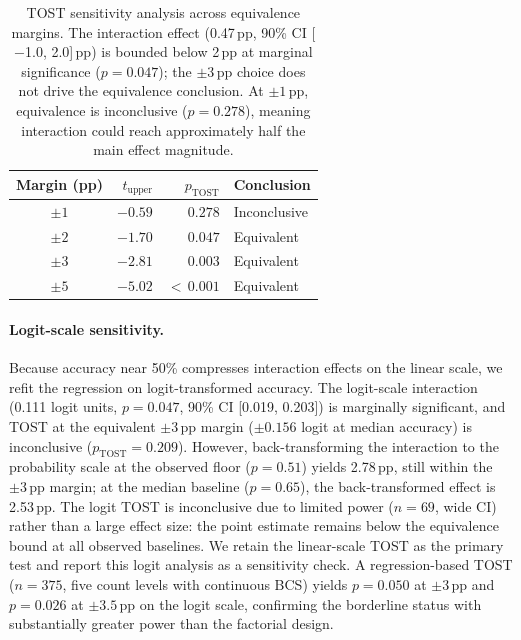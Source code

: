 \documentclass[11pt]{article}
\begin{document}
\begin{table}[h]
\centering
\small
\caption{TOST sensitivity analysis across equivalence margins. The interaction effect (0.47\,pp, 90\% CI [$-$1.0, 2.0]\,pp) is bounded below 2\,pp at marginal significance ($p = 0.047$); the $\pm 3$\,pp choice does not drive the equivalence conclusion. At $\pm 1$\,pp, equivalence is inconclusive ($p = 0.278$), meaning interaction could reach approximately half the main effect magnitude.}
\label{tab:tost_sensitivity}
\begin{tabular}{crrl}
\toprule
\textbf{Margin (pp)} & \textbf{$t_{\text{upper}}$} & \textbf{$p_{\text{TOST}}$} & \textbf{Conclusion} \\
\midrule
$\pm 1$ & $-0.59$ & $0.278$ & Inconclusive \\
$\pm 2$ & $-1.70$ & $0.047$ & Equivalent \\
$\pm 3$ & $-2.81$ & $0.003$ & Equivalent \\
$\pm 5$ & $-5.02$ & ${<}\,0.001$ & Equivalent \\
\bottomrule
\end{tabular}
\end{table}

\paragraph{Logit-scale sensitivity.}
Because accuracy near 50\% compresses interaction effects on the linear scale, we refit the regression on logit-transformed accuracy. The logit-scale interaction (0.111 logit units, $p = 0.047$, 90\% CI [0.019, 0.203]) is marginally significant, and TOST at the equivalent $\pm 3$\,pp margin ($\pm 0.156$ logit at median accuracy) is inconclusive ($p_{\text{TOST}} = 0.209$). However, back-transforming the interaction to the probability scale at the observed floor ($p = 0.51$) yields 2.78\,pp, still within the $\pm 3$\,pp margin; at the median baseline ($p = 0.65$), the back-transformed effect is 2.53\,pp. The logit TOST is inconclusive due to limited power ($n = 69$, wide CI) rather than a large effect size: the point estimate remains below the equivalence bound at all observed baselines. We retain the linear-scale TOST as the primary test and report this logit analysis as a sensitivity check. A regression-based TOST ($n = 375$, five count levels with continuous BCS) yields $p = 0.050$ at $\pm 3$\,pp and $p = 0.026$ at $\pm 3.5$\,pp on the logit scale, confirming the borderline status with substantially greater power than the factorial design.
\end{document}
